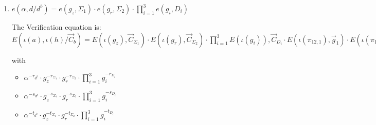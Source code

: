 \begin{description}
\begin{enumerate}
    The Verification equation is: $ E(\iota(C_3'/\vec{C}_{\Delta_3'}), \iota(d)) = E(\vec{C}_{D_3},\iota(d)) \cdot E(\iota(h^{-1}), \vec{C}_{S_1'}) \cdot E(\iota(h^{-1}), \vec{C}_{S_2'}) \cdot E(\iota(\pi_{10,1}), \vec{g}_1)\cdot E(\iota(\pi_{10,2}), \vec{g}_2)\cdot E(\iota(\pi_{10,3}), \vec{g}_3)$

    with
    \begin{itemize}
    \item[$\pi_{10,1} = $] $d^{-r_{\Delta_3'}} \cdot d^{-r_{D_3}} \cdot h^{r_{S_1'}} \cdot h^{r_{S_2'}}$
    \item[$\pi_{10,2} = $] $d^{-s_{\Delta_3'}} \cdot d^{-s_{D_3}} \cdot h^{s_{S_1'}} \cdot h^{s_{S_2'}}$
    \item[$\pi_{10,3} = $] $d^{-t_{\Delta_3'}} \cdot d^{-t_{D_3}} \cdot h^{t_{S_1'}} \cdot h^{t_{S_2'}}$
    \end{itemize}

    The new proofs of the equations are:

    \begin{itemize}
    \item[$\tilde{\pi}_{10,1} = $] $\pi_{10,1}' \cdot d^{-\tilde{r}_{\Delta_3'}} \cdot d^{-\tilde{r}_{D_3}} \cdot h^{\tilde{r}_{S_1'}} \cdot h^{\tilde{r}_{S_2'}}$
    \item[$\tilde{\pi}_{10,2} = $] $\pi_{10,1}' \cdot d^{-\tilde{s}_{\Delta_3'}} \cdot d^{-\tilde{s}_{D_3}} \cdot h^{\tilde{s}_{S_1'}} \cdot h^{\tilde{s}_{S_2'}}$
    \item[$\tilde{\pi}_{10,3} = $] $\pi_{10,1}' \cdot d^{-\tilde{t}_{\Delta_3'}} \cdot d^{-\tilde{t}_{D_3}} \cdot h^{\tilde{t}_{S_1'}} \cdot h^{\tilde{t}_{S_2'}}$
    \end{itemize}
    
    
  \item $e(\alpha, d/\boxed{d^b}) = e(g_z, \boxed{\Sigma_1}) \cdot e(g_r, \boxed{\Sigma_2}) \cdot \prod_{i=1}^3 e(g_i, \boxed{D_i})$

    The Verification equation is: $E(\iota(a), \iota(h)/\vec{C}_{b}) = E(\iota(g_z), \vec{C}_{\Sigma_1}) \cdot E(\iota(g_r), \vec{C}_{\Sigma_2}) \cdot \prod_{i=1}^3 E(\iota(g_i)), \vec{C}_{D_i} \cdot E(\iota(\pi_{12,1}), \vec{g}_1)\cdot E(\iota(\pi_{12,2}), \vec{g}_2)\cdot E(\iota(\pi_{12,3}), \vec{g}_3)$

    with
    \begin{itemize}
    \item[$\pi_{12,1} = $] $\alpha^{-r_{d^b}} \cdot g_z^{-r_{\Sigma_1}} \cdot g_r^{-r_{\Sigma_2}} \cdot \prod_{i=1}^3 g_i^{-r_{D_i}}$
    \item[$\pi_{12,2} = $] $\alpha^{-s_{d^b}} \cdot g_z^{-s_{\Sigma_1}} \cdot g_r^{-s_{\Sigma_2}} \cdot \prod_{i=1}^3 g_i^{-s_{D_i}}$
    \item[$\pi_{12,3} = $] $\alpha^{-t_{d^b}} \cdot g_z^{-t_{\Sigma_1}} \cdot g_r^{-t_{\Sigma_2}} \cdot \prod_{i=1}^3 g_i^{-t_{D_i}}$
    \end{itemize}


\end{enumerate}
\end{description}
